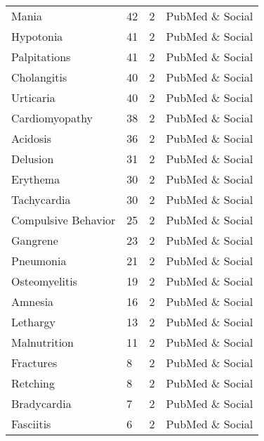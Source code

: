 \documentclass[referee,bst/sn-basic]{sn-jnl}%
\theoremstyle{thmstyletwo}%
\theoremstyle{thmstylethree}%
\begin{document}
\begin{appendices}
\begin{longtable}{llll}
Mania                                    & 42        & 2    & PubMed \& Social        \\
Hypotonia                                & 41        & 2    & PubMed \& Social        \\
Palpitations                             & 41        & 2    & PubMed \& Social        \\
Cholangitis                              & 40        & 2    & PubMed \& Social        \\
Urticaria                                & 40        & 2    & PubMed \& Social        \\
Cardiomyopathy                           & 38        & 2    & PubMed \& Social        \\
Acidosis                                 & 36        & 2    & PubMed \& Social        \\
Delusion                                 & 31        & 2    & PubMed \& Social        \\
Erythema                                 & 30        & 2    & PubMed \& Social        \\
Tachycardia                              & 30        & 2    & PubMed \& Social        \\
Compulsive Behavior                      & 25        & 2    & PubMed \& Social        \\
Gangrene                                 & 23        & 2    & PubMed \& Social        \\
Pneumonia                                & 21        & 2    & PubMed \& Social        \\
Osteomyelitis                            & 19        & 2    & PubMed \& Social        \\
Amnesia                                  & 16        & 2    & PubMed \& Social        \\
Lethargy                                 & 13        & 2    & PubMed \& Social        \\
Malnutrition                             & 11        & 2    & PubMed \& Social        \\
Fractures                                & 8         & 2    & PubMed \& Social        \\
Retching                                 & 8         & 2    & PubMed \& Social        \\
Bradycardia                              & 7         & 2    & PubMed \& Social        \\
Fasciitis                                & 6         & 2    & PubMed \& Social        \\

\end{longtable}
\end{appendices}
\end{document}
